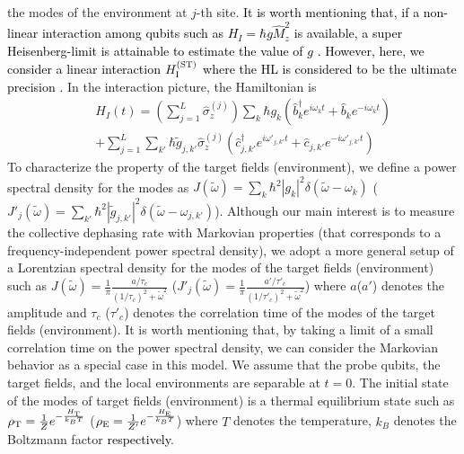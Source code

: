 \documentclass[prl,twocolumn,superscriptaddress]{revtex4}
\begin{document}
the modes of the environment at $j$-th site. 
\textcolor{black}{It is worth mentioning that, if a non-linear
interaction among qubits such as $H_I=\hbar g \hat{M}_z^2$ is available, a super
Heisenberg-limit is attainable to estimate the value of $g$
\cite{luis2004nonlinear,boixo2007generalized,roy2008exponentially,napolitano2011interaction,beau2017nonlinear}. However, here, we
consider a linear interaction $H^{(\rm{ST})}_{\rm{I}}$ where 
the HL is considered to be the ultimate precision \cite{giovannetti2004quantum, giovannetti2006quantum,giovannetti2011advances}.}
In the interaction picture, the Hamiltonian is
\begin{eqnarray}
&& H_I(t)=(\sum_{j=1}^{L}\hat{\sigma }_z^{(j)})\sum_{k}\hbar g_k
   (\hat{b}^{\dagger }_k e^{i\omega _kt}+\hat{b}_ke^{-i\omega
   _kt})\nonumber \\
   &&+\sum_{j=1}^{L}\sum_{k'}\hbar \tilde{g}_{j,k'}\hat{\sigma }_z^{(j)}
   (\hat{c}^{\dagger }_{j,k'}e^{i\omega '_{j,k'}t} +\hat{c}_{j,k'}e^{-i\omega '_{j,k'}t})
\end{eqnarray}
To characterize the property of the target fields (environment), we define a
power spectral density for the modes as
$J(\tilde{\omega} )=\sum_{k}\hbar ^2|g_k|^2 \delta (\tilde{\omega} -\omega
   _k)$ ($J'_j(\tilde{\omega} )=\sum_{k'}\hbar ^2|\tilde{g}_{j,k'}|^2 \delta (\tilde{\omega} -\omega
   _{j,k'})$).
   Although our main interest is to measure the collective dephasing rate
   with Markovian properties (that corresponds to a frequency-independent
   power spectral density), we adopt a more general setup of a Lorentzian  spectral
   density for the modes of the target fields (environment)
   such as $J(\tilde{\omega} )=\frac{1}{\pi }\frac{a/\tau _c}{(1/\tau _c)^2 +\tilde{\omega} ^2}$  
   ($J'_j(\tilde{\omega} )
    =\frac{1}{\pi }\frac{a'/\tau '_c}{(1/\tau '_c)^2 +\tilde{\omega} ^2}$)
   where $a$($a'$) denotes the amplitude and $\tau _c$ ($\tau '_c$) denotes the correlation
   time of the modes of the target fields (environment). It is worth
   mentioning that, by taking a limit of a small correlation time on the power
   spectral density, we can
   consider the Markovian behavior as a special case in this model. 
   We assume that
   the probe qubits, the target fields, and the local environments
   are separable at $t=0$.
     The initial state of the modes of target fields (environment) is a thermal
   equilibrium state such as $\rho
   _{\rm{T}}=\frac{1}{Z}e^{-\frac{H_{\rm{T}}}{k_BT}}$ ($\rho
   _{\rm{E}}=\frac{1}{Z'}e^{-\frac{H_{\rm{E}}}{k_BT}}$) where $T$ denotes
   the temperature, $k_B$ denotes the Boltzmann factor \textcolor{black}{respectively}. 
\end{document}

